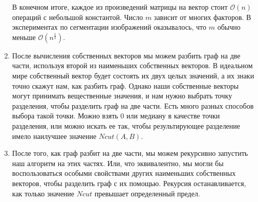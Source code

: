 \documentclass[a4paper,10pt]{article}
\theoremstyle{plain}
\theoremstyle{definition}
\theoremstyle{remark}
\begin{document}
\begin{enumerate}
В конечном итоге, каждое из произведений матрицы на вектор стоит $\mathcal{O}(n)$ операций с небольшой константой. Число $m$ зависит от многих факторов. В экспериментах по сегментации изображений оказывалось, что $m$ обычно меньше $\mathcal{O}(n ^ \frac{1}{2})$.
\item После вычисления собственных векторов мы можем разбить граф на две части, используя второй из наименьших собственных векторов. В идеальном мире собственный вектор будет состоять их двух целых значений, а их знаки точно скажут нам, как разбить граф. Однако наши собственные векторы могут принимать вещественные значения, и нам нужно выбрать точку разделения, чтобы разделить граф на две части. Есть много разных способов выбора такой точки. Можно взять 0 или медиану в качестве точки разделения, или можно искать ее так, чтобы результирующее разделение имело наилучшее значение \hyperref[sec:pre]{$Ncut ( A , B )$}.
\item После того, как граф разбит на две части, мы можем рекурсивно запустить наш алгоритм на этих частях. Или, что эквивалентно, мы могли бы воспользоваться особыми свойствами других наименьших собственных векторов, чтобы разделить граф с их помощью. Рекурсия останавливается, как только значение $Ncut$ превышает определенный предел.
\end{enumerate}

\nocite{*}


\end{document}
